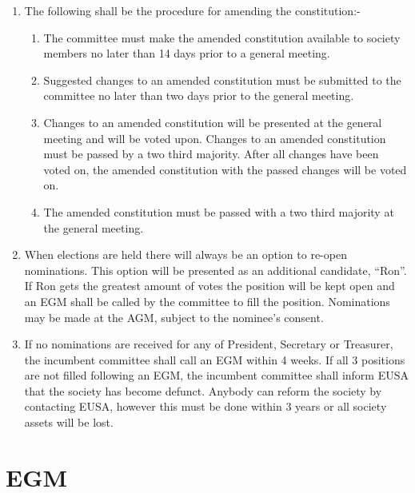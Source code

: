 \documentclass{article}
\begin{document}
\begin{enumerate}
  \item The following shall be the procedure for amending the constitution:-
    \begin{enumerate}
      \item The committee must make the amended constitution available to
        society members no later than 14 days prior to a general meeting.
      \item Suggested changes to an amended constitution must be submitted to
        the committee no later than two days prior to the general meeting.
      \item Changes to an amended constitution will be presented at the general
        meeting and will be voted upon. Changes to an amended constitution
        must be passed by a two third majority. After all changes have been
        voted on, the amended constitution with the passed changes will be
        voted on.
      \item The amended constitution must be passed with a two third majority
        at the general meeting.
    \end{enumerate}
    
  \item When elections are held there will always be an option to re-open nominations.
    This option will be presented as an additional candidate, “Ron”.
    If Ron gets the greatest amount of votes the position will be kept open
    and an EGM shall be called by the committee to fill the position.
    Nominations may be made at the AGM, subject to the nominee's
    consent.

  \item If no nominations are received for any of President, Secretary or Treasurer,
    the incumbent committee shall call an EGM within 4 weeks. If all 3
    positions are not filled following an EGM, the incumbent committee shall
    inform EUSA that the society has become defunct. Anybody can reform
    the society by contacting EUSA, however this must be done within 3 years
    or all society assets will be lost.

\end{enumerate}





\newpage{}
\section{EGM}
\end{document}
